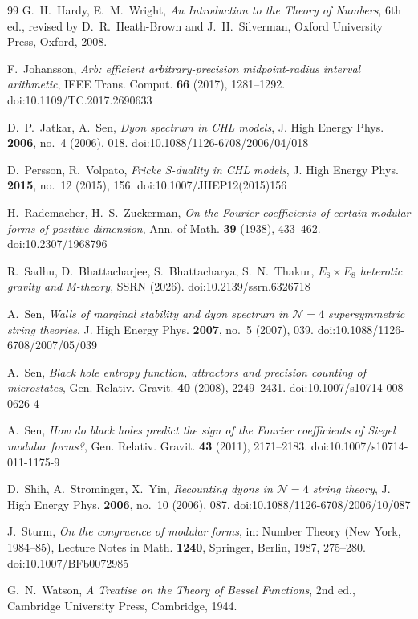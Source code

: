 \documentclass[11pt]{amsart}
\theoremstyle{definition}
\begin{document}
\begin{thebibliography}{99}
 G.~H.~Hardy, E.~M.~Wright, \emph{An Introduction to the Theory of Numbers}, 6th ed., revised by D.~R.~Heath-Brown and J.~H.~Silverman, Oxford University Press, Oxford, 2008.

 F.~Johansson, \emph{Arb: efficient arbitrary-precision midpoint-radius interval arithmetic}, IEEE Trans. Comput. \textbf{66} (2017), 1281--1292. doi:10.1109/TC.2017.2690633

 D.~P.~Jatkar, A.~Sen, \emph{Dyon spectrum in CHL models}, J. High Energy Phys. \textbf{2006}, no.~4 (2006), 018. doi:10.1088/1126-6708/2006/04/018

 D.~Persson, R.~Volpato, \emph{Fricke S-duality in CHL models}, J. High Energy Phys. \textbf{2015}, no.~12 (2015), 156. doi:10.1007/JHEP12(2015)156

 H.~Rademacher, H.~S.~Zuckerman, \emph{On the Fourier coefficients of certain modular forms of positive dimension}, Ann. of Math. \textbf{39} (1938), 433--462. doi:10.2307/1968796

 R.~Sadhu, D.~Bhattacharjee, S.~Bhattacharya, S.~N.~Thakur, \emph{$E_8\times E_8$ heterotic gravity and M-theory}, SSRN (2026). doi:10.2139/ssrn.6326718

 A.~Sen, \emph{Walls of marginal stability and dyon spectrum in $\mathcal N=4$ supersymmetric string theories}, J. High Energy Phys. \textbf{2007}, no.~5 (2007), 039. doi:10.1088/1126-6708/2007/05/039

 A.~Sen, \emph{Black hole entropy function, attractors and precision counting of microstates}, Gen. Relativ. Gravit. \textbf{40} (2008), 2249--2431. doi:10.1007/s10714-008-0626-4

 A.~Sen, \emph{How do black holes predict the sign of the Fourier coefficients of Siegel modular forms?}, Gen. Relativ. Gravit. \textbf{43} (2011), 2171--2183. doi:10.1007/s10714-011-1175-9

 D.~Shih, A.~Strominger, X.~Yin, \emph{Recounting dyons in $\mathcal N=4$ string theory}, J. High Energy Phys. \textbf{2006}, no.~10 (2006), 087. doi:10.1088/1126-6708/2006/10/087

 J.~Sturm, \emph{On the congruence of modular forms}, in: Number Theory (New York, 1984--85), Lecture Notes in Math. \textbf{1240}, Springer, Berlin, 1987, 275--280. doi:10.1007/BFb0072985

 G.~N.~Watson, \emph{A Treatise on the Theory of Bessel Functions}, 2nd ed., Cambridge University Press, Cambridge, 1944.


\end{thebibliography}
\end{document}

